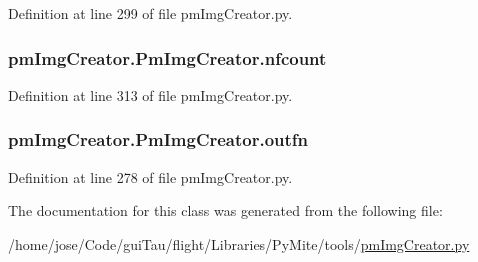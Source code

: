 Definition at line 299 of file pm\-Img\-Creator.\-py.

\hypertarget{classpm_img_creator_1_1_pm_img_creator_ab69f298a6d8c75d5ea54bfab9cf02f83}{
\subsubsection[{nfcount}]{\setlength{\rightskip}{0pt plus 5cm}pm\-Img\-Creator.\-Pm\-Img\-Creator.\-nfcount}}\label{classpm_img_creator_1_1_pm_img_creator_ab69f298a6d8c75d5ea54bfab9cf02f83}


Definition at line 313 of file pm\-Img\-Creator.\-py.

\hypertarget{classpm_img_creator_1_1_pm_img_creator_a75df28e03f77f979b3ff008a9c0c2d50}{
\subsubsection[{outfn}]{\setlength{\rightskip}{0pt plus 5cm}pm\-Img\-Creator.\-Pm\-Img\-Creator.\-outfn}}\label{classpm_img_creator_1_1_pm_img_creator_a75df28e03f77f979b3ff008a9c0c2d50}


Definition at line 278 of file pm\-Img\-Creator.\-py.



The documentation for this class was generated from the following file\-:\begin{DoxyCompactItemize}
\item 
/home/jose/\-Code/gui\-Tau/flight/\-Libraries/\-Py\-Mite/tools/\hyperlink{pm_img_creator_8py}{pm\-Img\-Creator.\-py}\end{DoxyCompactItemize}
